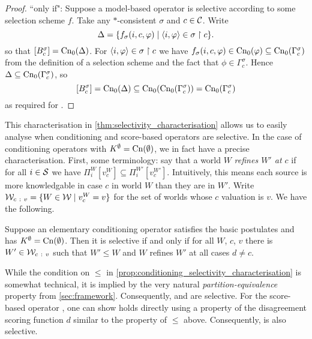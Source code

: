 \begin{proof}
    ``only if": Suppose a model-based operator is selective according to some
    selection scheme $f$. Take any $\ast$-consistent $\sigma$ and $c \in \C$.
    Write
    \[
        \Delta = \{
            f_\sigma(i, c, \phi)
            \mid
            \tuple{i, \phi} \in \sigma \rs c
        \}.
    \]
    so that $\proppart{B^\sigma_c} = \cnprop(\Delta)$. For $\tuple{i, \phi} \in
    \sigma \rs c$ we have $f_\sigma(i, c, \phi) \in \cnprop(\phi) \subseteq
    \cnprop(\Gamma^\sigma_c)$ from the definition of a selection scheme and the
    fact that $\phi \in \Gamma^\sigma_c$. Hence $\Delta \subseteq
    \cnprop(\Gamma^\sigma_c)$, so
    \[
        \proppart{B^\sigma_c}
        = \cnprop(\Delta)
        \subseteq \cnprop(\cnprop(\Gamma^\sigma_c))
        = \cnprop(\Gamma^\sigma_c)
    \]
    as required for \boundedness{}.
\end{proof}


This characterisation in \cref{thm:selectivity_characterisation} allows us to
easily analyse when conditioning and score-based operators are selective. In
the case of conditioning operators with $K^\emptyset = \cn(\emptyset)$, we in
fact have a precise characterisation. First, some terminology: say that a world
$W$ \emph{refines $W'$ at $c$} if for all $i \in \S$ we have $\Pi^W_i[v^W_c]
\subseteq \Pi^{W'}_i[v^{W'}_c]$. Intuitively, this means each source is more
knowledgable in case $c$ in world $W$ than they are in $W'$. Write $\W_{c\ :\
v} = \{W \in \W \mid v^W_c = v\}$ for the set of worlds whose $c$ valuation is
$v$. We have the following.

\begin{proposition}
    \label{prop:conditioning_selectivity_characterisation}
    Suppose an elementary conditioning operator satisfies the basic postulates
    and has $K^\emptyset = \cn(\emptyset)$. Then it is selective if and only if
    for all $W$, $c$, $v$ there is $W' \in \W_{c\ :\ v}$ such that $W' \le W$
    and $W$ refines $W'$ at all cases $d \ne c$.
\end{proposition}

While the condition on $\le$ in
\cref{prop:conditioning_selectivity_characterisation} is somewhat technical, it
is implied by the very natural \emph{partition-equivalence} property from
\cref{sec:framework}. Consequently, \varbasedcond{} and \partbasedcond{} are
selective. For the score-based operator \scorebasedop{}, one can show
\boundedness{} holds directly using a property of the disagreement scoring
function $d$ similar to the property of $\le$ above. Consequently,
\scorebasedop{} is also selective.

